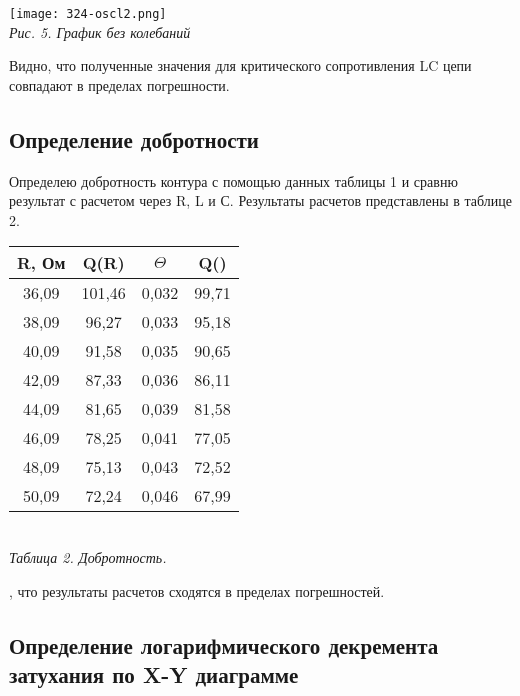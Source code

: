 \begin{center}

    \texttt{[image: 324-oscl2.png]} \\
    \textit{Рис. 5. График без колебаний}

\end{center}

Видно, что полученные значения для критического сопротивления LC цепи совпадают в пределах погрешности.

\newpage

\subsection{Определение добротности}

Определею добротность контура с помощью данных таблицы 1 и сравню результат с расчетом через R, L и С. Результаты расчетов представлены в таблице 2.

\begin{table}[!h]
    \begin{center}
    \begin{tabular}{|c|c|c|c|}
    \hline
    R, Ом & Q(R)   & $\Theta$ &  Q(\mth{\Theta}) \\ \hline
    36,09 & 101,46 &     0,032    &       99,71      \\ \hline
    38,09 & 96,27  &     0,033    &       95,18      \\ \hline
    40,09 & 91,58  &     0,035    &       90,65      \\ \hline
    42,09 & 87,33  &     0,036    &       86,11      \\ \hline
    44,09 & 81,65  &     0,039    &       81,58      \\ \hline
    46,09 & 78,25  &     0,041    &       77,05      \\ \hline
    48,09 & 75,13  &     0,043    &       72,52      \\ \hline
    50,09 & 72,24  &     0,046    &       67,99      \\ \hline
    \end{tabular} \\ [0.2cm]
    \textit{Таблица 2. Добротность.}
    \end{center}
\end{table}

, что результаты расчетов сходятся в пределах погрешностей.

\subsection{Определение логарифмического декремента затухания по X-Y диаграмме}

